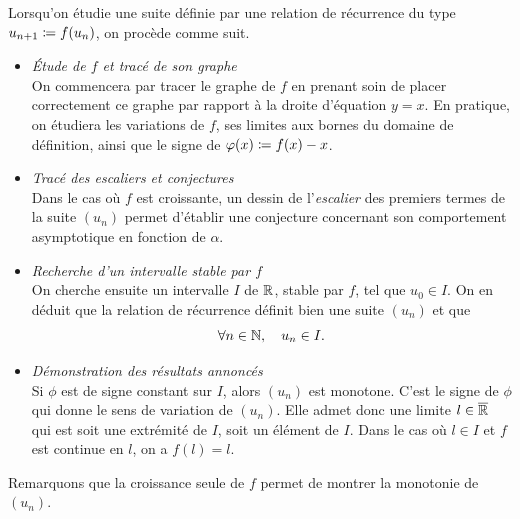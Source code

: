 \documentclass{magnoliaold}
\begin{document}
\begin{remarques}
\remarque
Lorsqu'on étudie une suite définie par une relation de récurrence du type $u_{n+1}\coloneqq f(u_n)$, on procède comme suit.
  \begin{itemize}
  \item \emph{Étude de $f$ et tracé de son graphe}\\
    On commencera par tracer le graphe de $f$ en prenant soin de placer correctement ce graphe par rapport à la droite d'équation $y=x$. En pratique, on étudiera les variations de $f$, ses limites aux bornes du domaine de définition, ainsi que le signe de $\varphi(x)\coloneqq f(x)-x$.
  \item \emph{Tracé des escaliers et conjectures}\\
    Dans le cas où $f$ est croissante, un dessin de l'\emph{escalier} des premiers termes de la suite $(u_n)$ permet d'établir une conjecture concernant son comportement asymptotique en fonction de $\alpha$.
  \item \emph{Recherche d'un intervalle stable par $f$}\\
    On cherche ensuite un intervalle $I$ de $\mathbb{R}$, stable par $f$, tel que $u_0\in I$.
    On en déduit que la relation de récurrence définit bien une suite $(u_n)$ et que
    \[\forall n\in\mathbb{N},\quad u_n\in I.\]
  \item \emph{Démonstration des résultats annoncés}\\
    Si $\phi$ est de signe constant sur $I$, alors $(u_n)$ est monotone. C'est
    le signe de $\phi$ qui donne le sens de variation de $(u_n)$. Elle admet donc une limite
    $l\in\overline{\mathbb{R}}$ qui est soit une extrémité de $I$, soit un élément de $I$. Dans le cas où
    $l\in I$ et $f$ est continue en $l$, on a $f(l)=l$.
  \end{itemize}
\remarque Remarquons que la croissance seule de $f$ permet de montrer la monotonie de
  $(u_n)$.
\end{remarques}
\end{document}
